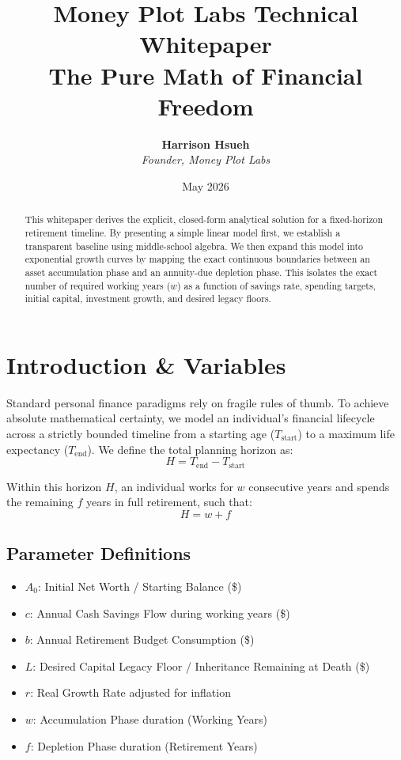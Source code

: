 \documentclass[11pt,letterpaper]{article}
\title{\textbf{\color{mpdark}Money Plot Labs Technical Whitepaper \\ The Pure Math of Financial Freedom}}
\author{\textbf{Harrison Hsueh} \\ \textit{Founder, Money Plot Labs}}
\date{May 2026}
\begin{document}
    
    \maketitle
    
    \begin{abstract}
    This whitepaper derives the explicit, closed-form analytical solution for a fixed-horizon retirement timeline. By presenting a simple linear model first, we establish a transparent baseline using middle-school algebra. We then expand this model into exponential growth curves by mapping the exact continuous boundaries between an asset accumulation phase and an annuity-due depletion phase. This isolates the exact number of required working years ($w$) as a function of savings rate, spending targets, initial capital, investment growth, and desired legacy floors.
    \end{abstract}
    
    \section{Introduction \& Variables}
    Standard personal finance paradigms rely on fragile rules of thumb. To achieve absolute mathematical certainty, we model an individual's financial lifecycle across a strictly bounded timeline from a starting age ($T_{\text{start}}$) to a maximum life expectancy ($T_{\text{end}}$). We define the total planning horizon as:
    \begin{equation}
    H = T_{\text{end}} - T_{\text{start}}
    \end{equation}
    
    Within this horizon $H$, an individual works for $w$ consecutive years and spends the remaining $f$ years in full retirement, such that:
    \begin{equation}
    H = w + f
    \end{equation}
    
    \subsection{Parameter Definitions}
    \begin{itemize}
        \item $A_0$: Initial Net Worth / Starting Balance (\$)
        \item $c$: Annual Cash Savings Flow during working years (\$)
        \item $b$: Annual Retirement Budget Consumption (\$)
        \item $L$: Desired Capital Legacy Floor / Inheritance Remaining at Death (\$)
        \item $r$: Real Growth Rate adjusted for inflation
        \item $w$: Accumulation Phase duration (Working Years)
        \item $f$: Depletion Phase duration (Retirement Years)
    \end{itemize}
    
\end{document}

